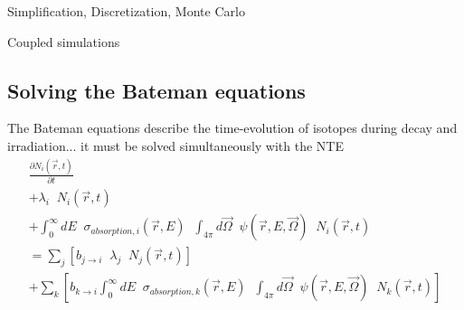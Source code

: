 \documentclass{beamer}
\begin{document}
        \begin{frame}{Simplification, Discretization, Monte Carlo}
        \end{frame}

        \begin{frame}{Coupled simulations}
        \end{frame}

    \subsection{Solving the Bateman equations}

        \begin{frame}{The Bateman equations describe the time-evolution of isotopes during decay and irradiation}{... it must be solved simultaneously with the NTE}
            \begin{equation*}
                \begin{split}
                    \frac{\partial N_i(\vec r, t)}{\partial t} \\
                    + \lambda_i \; \; N_i(\vec r, t) \\
                    + \int_0^\infty \! \! \! \! dE \; \; \sigma_{absorption,i} ( \vec r, E) \; \; \int_{4\pi} \! \! \! \! d\vec\Omega \; \; \psi(\vec r, E, \vec \Omega) \; \; N_i(\vec r, t) \\
                    = \sum_j \left[ b_{j \rightarrow i} \; \; \lambda_j \; \; N_j(\vec r, t) \right] \\
                    + \sum_k \left[ b_{k \rightarrow i} \int_0^\infty \! \! \! \! dE \; \; \sigma_{absorption,k} ( \vec r, E) \; \; \int_{4\pi} \! \! \! \! d\vec\Omega \; \; \psi(\vec r, E, \vec \Omega) \; \; N_k(\vec r, t) \right] \\
                \end{split}
            \end{equation*}
        \end{frame}
\end{document}
